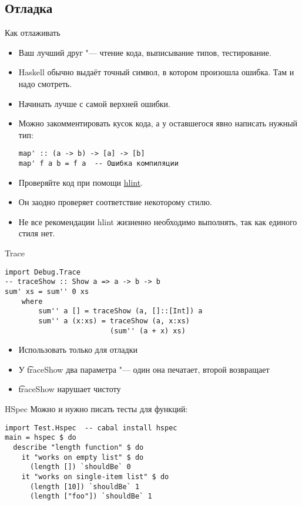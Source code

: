 \subsection{Отладка}

\begin{frame}
\end{frame}

\begin{frame}[fragile]{Как отлаживать}
	\begin{itemize}
		\item Ваш лучший друг "--- чтение кода, выписывание типов, тестирование.
		\item Haskell обычно выдаёт точный символ, в котором произошла ошибка. Там и надо смотреть.
		\item Начинать лучше с самой верхней ошибки.
		\item Можно закомментировать кусок кода, а у оставшегося явно написать нужный тип:
\begin{verbatim}
map' :: (a -> b) -> [a] -> [b]
map' f a b = f a  -- Ошибка компиляции
\end{verbatim}
		\item Проверяйте код при помощи \href{https://hackage.haskell.org/package/hlint}{hlint}.
		\item Он заодно проверяет соответствие некоторому стилю.
		\item Не все рекомендации hlint жизненно необходимо выполнять, так как единого стиля нет.
	\end{itemize}
\end{frame}

\begin{frame}[fragile]{Trace}
\begin{verbatim}
import Debug.Trace
-- traceShow :: Show a => a -> b -> b
sum' xs = sum'' 0 xs
    where
        sum'' a [] = traceShow (a, []::[Int]) a
        sum'' a (x:xs) = traceShow (a, x:xs)
                         (sum'' (a + x) xs)
\end{verbatim}
	\begin{itemize}
		\item Использовать только для отладки
		\item У \t{traceShow} два параметра "--- один она печатает, второй возвращает
		\item \t{traceShow} нарушает чистоту
	\end{itemize}
\end{frame}

\begin{frame}[fragile]{HSpec}
	Можно и нужно писать тесты для функций:
\begin{verbatim}
import Test.Hspec  -- cabal install hspec
main = hspec $ do
  describe "length function" $ do
    it "works on empty list" $ do
      (length []) `shouldBe` 0
    it "works on single-item list" $ do
      (length [10]) `shouldBe` 1
      (length ["foo"]) `shouldBe` 1
\end{verbatim}
\end{frame}
